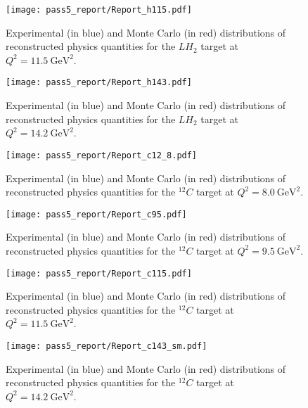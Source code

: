 \begin{figure}[!h]
    \centering
    \texttt{[image: pass5\_report/Report\_h115.pdf]}
    \caption{
            Experimental (in blue) and Monte Carlo (in red) distributions of
            reconstructed physics quantities for
            the $LH_2$ target at $Q^2=\SI{11.5}{\giga\electronvolt\squared}$.
            }
    \label{fig:Report_h115.pdf_pg3}
\end{figure}


\begin{figure}[!h]
    \centering
    \texttt{[image: pass5\_report/Report\_h143.pdf]}
    \caption{
            Experimental (in blue) and Monte Carlo (in red) distributions of
            reconstructed physics quantities for
            the $LH_2$ target at $Q^2=\SI{14.2}{\giga\electronvolt\squared}$.
            }
    \label{fig:Report_h143.pdf_pg3}
\end{figure}


\begin{figure}[!h]
    \centering
    \texttt{[image: pass5\_report/Report\_c12\_8.pdf]}
    \caption{
            Experimental (in blue) and Monte Carlo (in red) distributions of
            reconstructed physics quantities for
            the ${}^{12}C$ target at $Q^2=\SI{8.0}{\giga\electronvolt\squared}$.
            }
    \label{fig:Report_c12_8.pdf_pg3}
\end{figure}


\begin{figure}[!h]
    \centering
    \texttt{[image: pass5\_report/Report\_c95.pdf]}
    \caption{
            Experimental (in blue) and Monte Carlo (in red) distributions of
            reconstructed physics quantities for
            the ${}^{12}C$ target at $Q^2=\SI{9.5}{\giga\electronvolt\squared}$.
            }
    \label{fig:Report_c95.pdf_pg3}
\end{figure}


\begin{figure}[!h]
    \centering
    \texttt{[image: pass5\_report/Report\_c115.pdf]}
    \caption{
            Experimental (in blue) and Monte Carlo (in red) distributions of
            reconstructed physics quantities for
            the ${}^{12}C$ target at $Q^2=\SI{11.5}{\giga\electronvolt\squared}$.
            }
    \label{fig:Report_c115.pdf_pg3}
\end{figure}


\begin{figure}[!h]
    \centering
    \texttt{[image: pass5\_report/Report\_c143\_sm.pdf]}
    \caption{
            Experimental (in blue) and Monte Carlo (in red) distributions of
            reconstructed physics quantities for
            the ${}^{12}C$ target at $Q^2=\SI{14.2}{\giga\electronvolt\squared}$.
            }
    \label{fig:Report_c143_sm.pdf_pg3}
\end{figure}


